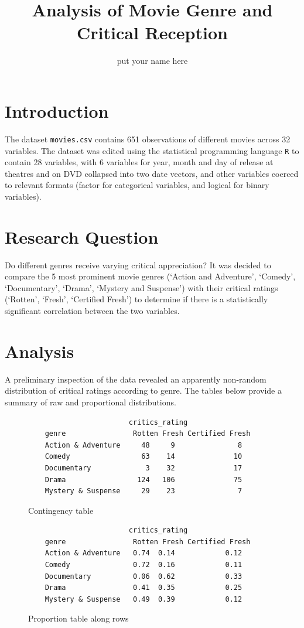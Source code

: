 \documentclass[12pt,a4paper]{article}
\author{put your name here}
\title{Analysis of Movie Genre and Critical Reception}
\begin{document}
	\maketitle
	
	\section*{Introduction}
	The dataset {\tt movies.csv} contains 651 observations of different movies across 32 variables. The dataset was edited using the statistical programming language {\tt R} to contain 28 variables, with 6 variables for year, month and day of release at theatres and on DVD collapsed into two date vectors, and other variables coerced to relevant formats (factor for categorical variables, and logical for binary variables). 
	
	\section*{Research Question}
	Do different genres receive varying critical appreciation? It was decided to compare the 5 most prominent movie genres (`Action and Adventure', `Comedy', `Documentary', `Drama', `Mystery and Suspense') with their critical ratings (`Rotten', `Fresh', `Certified Fresh') to determine if there is a statistically significant correlation between the two variables.
	
	\section*{Analysis}
	A preliminary inspection of the data revealed an apparently non-random distribution of critical ratings according to genre. The tables below provide a summary of raw and proportional distributions.
	\begin{figure}
			\begin{verbatim}
	                    critics_rating
	genre                Rotten Fresh Certified Fresh
	Action & Adventure     48     9               8
	Comedy                 63    14              10
	Documentary             3    32              17
	Drama                 124   106              75
	Mystery & Suspense     29    23               7
			\end{verbatim}
		\caption{\footnotesize Contingency table}
	\end{figure}
	\begin{figure}
			\begin{verbatim}
	                    critics_rating
	genre                Rotten Fresh Certified Fresh
	Action & Adventure   0.74  0.14            0.12
	Comedy               0.72  0.16            0.11
	Documentary          0.06  0.62            0.33
	Drama                0.41  0.35            0.25
	Mystery & Suspense   0.49  0.39            0.12
			\end{verbatim}
		\caption{\footnotesize Proportion table along rows}
	\end{figure}
\end{document}
